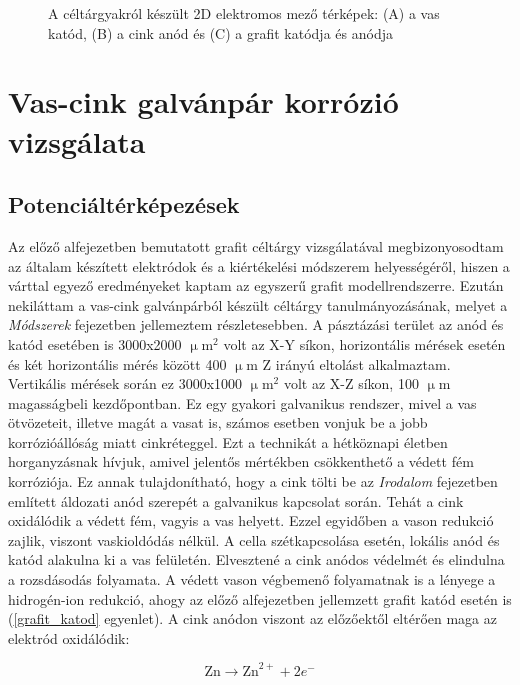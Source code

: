 \begin{figure}
\caption{A céltárgyakról készült 2D elektromos mező térképek:
(A) a vas katód, (B) a cink anód és (C) a grafit katódja és anódja}
\label{fig:field_h1}
\end{figure}


\section{Vas-cink galvánpár korrózió vizsgálata}
\subsection{Potenciáltérképezések}
Az előző alfejezetben bemutatott grafit céltárgy vizsgálatával megbizonyosodtam az általam készített elektródok és a kiértékelési módszerem helyességéről, hiszen a várttal egyező eredményeket kaptam az egyszerű grafit modellrendszerre. Ezután nekiláttam a vas-cink galvánpárból készült céltárgy tanulmányozásának, melyet a \emph{Módszerek} fejezetben jellemeztem részletesebben. A pásztázási terület az anód és katód esetében is 3000x2000 $\upmu$m$^2$ volt az X-Y síkon, horizontális mérések esetén és két horizontális mérés között 400 $\upmu$m Z irányú eltolást alkalmaztam. Vertikális mérések során ez 3000x1000 $\upmu$m$^2$ volt az X-Z síkon, 100 $\upmu$m magasságbeli kezdőpontban. Ez egy gyakori galvanikus rendszer, mivel a vas ötvözeteit, illetve magát a vasat is, számos esetben vonjuk be a jobb korrózióállóság miatt cinkréteggel. Ezt a technikát a hétköznapi életben horganyzásnak hívjuk, amivel jelentős mértékben csökkenthető a védett fém korróziója. Ez annak tulajdonítható, hogy a cink tölti be az \emph{Irodalom} fejezetben említett áldozati anód szerepét a galvanikus kapcsolat során. Tehát a cink oxidálódik a védett fém, vagyis a vas helyett. Ezzel egyidőben a vason redukció zajlik, viszont vaskioldódás nélkül. A cella szétkapcsolása esetén, lokális anód és katód alakulna ki a vas felületén. Elvesztené a cink anódos védelmét és elindulna a rozsdásodás folyamata.
A védett vason végbemenő folyamatnak is a lényege a hidrogén-ion redukció, ahogy az előző alfejezetben jellemzett grafit katód esetén is (\ref{grafit_katod} egyenlet). A cink anódon viszont az előzőektől eltérően maga az elektród oxidálódik:


\begin{equation}
\textrm{Zn} \longrightarrow \textrm{Zn}^{2+} + 2e^- 
\label{cink_anod}
\end{equation}


